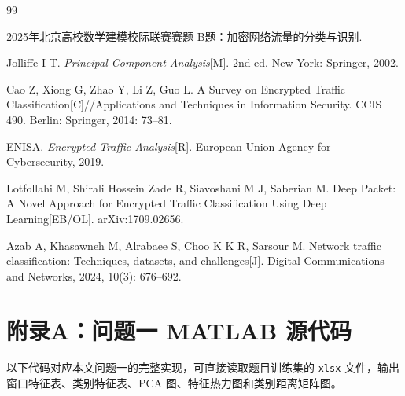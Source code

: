 \documentclass[UTF8,a4paper,12pt]{ctexart}
\begin{document}
\begin{thebibliography}{99}

 2025年北京高校数学建模校际联赛赛题 B题：加密网络流量的分类与识别.

 Jolliffe I T. \textit{Principal Component Analysis}[M]. 2nd ed. New York: Springer, 2002.

 Cao Z, Xiong G, Zhao Y, Li Z, Guo L. A Survey on Encrypted Traffic Classification[C]//Applications and Techniques in Information Security. CCIS 490. Berlin: Springer, 2014: 73--81.

 ENISA. \textit{Encrypted Traffic Analysis}[R]. European Union Agency for Cybersecurity, 2019.

 Lotfollahi M, Shirali Hossein Zade R, Siavoshani M J, Saberian M. Deep Packet: A Novel Approach for Encrypted Traffic Classification Using Deep Learning[EB/OL]. arXiv:1709.02656.

 Azab A, Khasawneh M, Alrabaee S, Choo K K R, Sarsour M. Network traffic classification: Techniques, datasets, and challenges[J]. Digital Communications and Networks, 2024, 10(3): 676--692.

\end{thebibliography}

\appendix

\section{附录A：问题一 MATLAB 源代码}
以下代码对应本文问题一的完整实现，可直接读取题目训练集的 \texttt{xlsx} 文件，输出窗口特征表、类别特征表、PCA 图、特征热力图和类别距离矩阵图。
\end{document}
